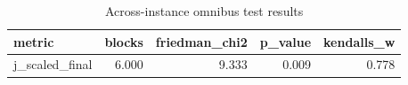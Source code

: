\begin{table}[!t]
\centering
\caption{Across-instance omnibus test results}
\label{tab:friedman_omnibus_generated}
\begin{tabular}{lrrrr}
\toprule
metric & blocks & friedman_chi2 & p_value & kendalls_w \\
\midrule
j_scaled_final & 6.000 & 9.333 & 0.009 & 0.778 \\
\bottomrule
\end{tabular}

\end{table}